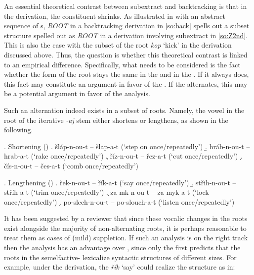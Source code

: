 An essential theoretical contrast between subextract and backtracking is that in the  derivation, the  constituent shrinks.  As illustrated in  with an abstract sequence of s, \textit{ROOT} in a backtracking derivation in \ref{so:back} spells out a subset structure spelled out as \textit{ROOT} in a derivation involving subextract in \ref{so:Z2nd}. This is also the case with the subset  of the root \textit{kop} `kick' in the  derivation discussed above. 
Thus, the question is whether this theoretical contrast is linked to an empirical difference. Specifically, what needs to be considered is the fact whether the form of the root stays the same in the  and in the . If it always does, this fact may constitute an argument in favor of the . If the  alternates, this may be a potential argument in favor of the  analysis.
\par
Such an alternation indeed exists in a subset of  roots. Namely, the vowel in the root of the iterative \textit{-aj} stem either shortens or lengthens, as shown in the following.

\ex.\label{short} Shortening ()
\a. \v{s}l\'ap-n-ou-t -- \v{s}lap-a-t (`step on once/repeatedly')
\b.  hr\'ab-n-ou-t -- hrab-a-t (`rake once/repeatedly')
\c. \v{r}\'iz-n-ou-t -- \v{r}ez-a-t (`cut once/repeatedly')
\d. \v{c}\'is-n-ou-t -- \v{c}es-a-t (`comb once/repeatedly')

\ex.\label{leng} Lengthening ()
\a. \v{r}ek-n-ou-t -- \v{r}\'ik-a-t (`say once/repeatedly')
\b. st\v{r}ih-n-ou-t -- st\v{r}\'ih-a-t (`trim once/repeatedly')
\c. za-mk-n-ou-t -- za-myk-a-t (`lock once/repeatedly')
\d. po-slech-n-ou-t -- po-slouch-a-t (`listen once/repeatedly')

It has been suggested by a reviewer that since these vocalic changes in the roots exist alongside the majority of non-alternating roots, it is perhaps reasonable to treat them as cases of (mild) suppletion. If such an analysis is on the right track then the  analysis has an advantage over , since only the first predicts that the roots in the  semelfactive- lexicalize syntactic structures of different sizes. For example, under the  derivation, the  \textit{\v{r}\'ik} `say' could realize the structure as in: 

